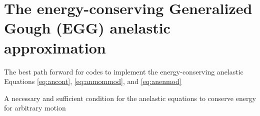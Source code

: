\documentclass[12pt]{article}
\begin{document}
\section{The energy-conserving Generalized Gough (EGG) anelastic approximation}
The best path forward for codes to implement the energy-conserving anelastic Equations \eqref{eq:ancont}, \eqref{eq:anmommod}, and \eqref{eq:anenmod}

A necessary and sufficient condition for the anelastic equations to conserve energy for arbitrary motion 
	\newpage
		
\end{document}
